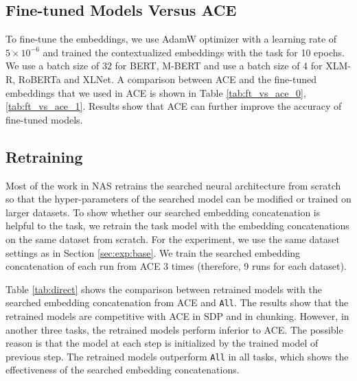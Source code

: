 \documentclass[11pt,a4paper]{article}
\begin{document}
\subsection{Fine-tuned Models Versus ACE}
\label{sec:finetune}
To fine-tune the embeddings, we use AdamW \citep{loshchilov2018decoupled} optimizer with a learning rate of $5\times 10^{-6}$ and trained the contextualized embeddings with the task for 10 epochs. We use a batch size of 32 for BERT, M-BERT and use a batch size of 4 for XLM-R, RoBERTa and XLNet. A comparison between ACE and the fine-tuned embeddings that we used in ACE is shown in Table \ref{tab:ft_vs_ace_0}, \ref{tab:ft_vs_ace_1}. Results show that ACE can further improve the accuracy of fine-tuned models. 


\subsection{Retraining}
Most of the work \citep{zoph2016neural,zoph2018learning,pham2018efficient,so2019evolved,zhu2020autotrans} in NAS retrains the searched neural architecture from scratch so that the hyper-parameters of the searched model can be modified or trained on larger datasets. To show whether our searched embedding concatenation is helpful to the task, we retrain the task model with the embedding concatenations on the same dataset from scratch. For the experiment, we use the same dataset settings as in Section \ref{sec:exp:base}. We train the searched embedding concatenation of each run from ACE 3 times (therefore, 9 runs for each dataset). 

Table \ref{tab:direct} shows the comparison between retrained models with the searched embedding concatenation from ACE and \texttt{All}. The results show that the retrained models are competitive with ACE in SDP and in chunking. However, in another three tasks, the retrained models perform inferior to ACE. The possible reason is that the model at each step is initialized by the trained model of previous step. The retrained models outperform \texttt{All} in all tasks, which shows the effectiveness of the searched embedding concatenations. 
\end{document}
